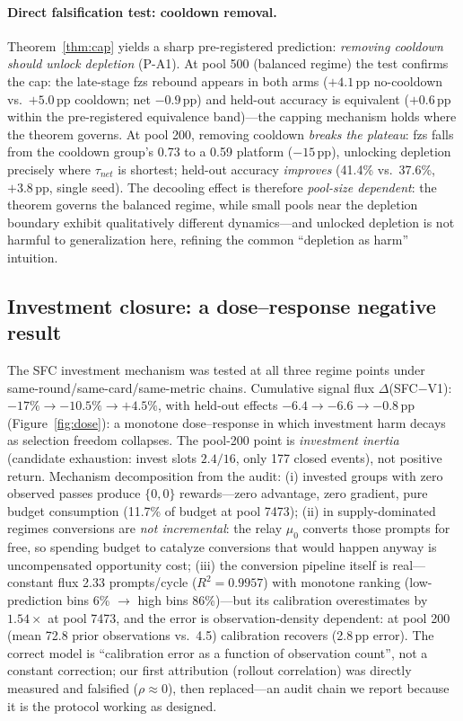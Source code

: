 \documentclass[11pt]{article}
\theoremstyle{definition}
\begin{document}
\paragraph{Direct falsification test: cooldown removal.} Theorem~\ref{thm:cap}
yields a sharp pre-registered prediction: \emph{removing cooldown should unlock
depletion} (P-A1). At pool 500 (balanced regime) the test confirms the cap: the
late-stage fzs rebound appears in both arms ($+4.1$\,pp no-cooldown vs.\ $+5.0$\,pp
cooldown; net $-0.9$\,pp) and held-out accuracy is equivalent ($+0.6$\,pp within
the pre-registered equivalence band)---the capping mechanism holds where the
theorem governs. At pool 200, removing cooldown \emph{breaks the plateau}: fzs
falls from the cooldown group's 0.73 to a 0.59 platform ($-15$\,pp), unlocking
depletion precisely where $\tau_{net}$ is shortest; held-out accuracy
\emph{improves} (41.4\% vs.\ 37.6\%, $+3.8$\,pp, single seed). The decooling
effect is therefore \emph{pool-size dependent}: the theorem governs the balanced
regime, while small pools near the depletion boundary exhibit qualitatively
different dynamics---and unlocked depletion is not harmful to generalization here,
refining the common ``depletion as harm'' intuition.

\subsection{Investment closure: a dose--response negative result}\label{sec:l3-invest}
The SFC investment mechanism was tested at all three regime points under
same-round/same-card/same-metric chains. Cumulative signal flux
$\Delta$(SFC$-$V1): $-17\%\to-10.5\%\to+4.5\%$, with held-out effects
$-6.4\to-6.6\to-0.8$\,pp (Figure~\ref{fig:dose}): a monotone dose--response in
which investment harm decays as selection freedom collapses. The pool-200 point is
\emph{investment inertia} (candidate exhaustion: invest slots $2.4/16$, only 177
closed events), not positive return. Mechanism decomposition from the audit:
(i) invested groups with zero observed passes produce $\{0,0\}$ rewards---zero
advantage, zero gradient, pure budget consumption (11.7\% of budget at pool 7473);
(ii) in supply-dominated regimes conversions are \emph{not incremental}: the relay
$\mu_0$ converts those prompts for free, so spending budget to catalyze conversions
that would happen anyway is uncompensated opportunity cost; (iii) the conversion
pipeline itself is real---constant flux 2.33 prompts/cycle ($R^2{=}0.9957$) with
monotone ranking (low-prediction bins 6\% $\to$ high bins 86\%)---but its
calibration overestimates by $1.54\times$ at pool 7473, and the error is
observation-density dependent: at pool 200 (mean 72.8 prior observations vs.\
4.5) calibration recovers (2.8\,pp error). The correct model is ``calibration
error as a function of observation count'', not a constant correction; our first
attribution (rollout correlation) was directly measured and falsified
($\rho\approx0$), then replaced---an audit chain we report because it is the
protocol working as designed.
\end{document}
